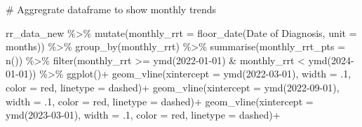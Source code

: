 \documentclass[
  letterpaper,
  DIV=11,
  numbers=noendperiod]{scrartcl}
\newenvironment{Shaded}{\begin{snugshade}}{\end{snugshade}}
\newcommand{\AttributeTok}[1]{\textcolor[rgb]{0.40,0.45,0.13}{#1}}
\newcommand{\CommentTok}[1]{\textcolor[rgb]{0.37,0.37,0.37}{#1}}
\newcommand{\DecValTok}[1]{\textcolor[rgb]{0.68,0.00,0.00}{#1}}
\newcommand{\FunctionTok}[1]{\textcolor[rgb]{0.28,0.35,0.67}{#1}}
\newcommand{\NormalTok}[1]{\textcolor[rgb]{0.00,0.23,0.31}{#1}}
\newcommand{\SpecialCharTok}[1]{\textcolor[rgb]{0.37,0.37,0.37}{#1}}
\newcommand{\StringTok}[1]{\textcolor[rgb]{0.13,0.47,0.30}{#1}}
\begin{document}
\begin{Shaded}
\begin{Highlighting}[]
\CommentTok{\# Aggregrate dataframe to show monthly trends}

\NormalTok{rr\_data\_new }\SpecialCharTok{\%\textgreater{}\%} 
  \FunctionTok{mutate}\NormalTok{(}\AttributeTok{monthly\_rrt =} \FunctionTok{floor\_date}\NormalTok{(}\StringTok{\textasciigrave{}}\AttributeTok{Date of Diagnosis}\StringTok{\textasciigrave{}}\NormalTok{, }\AttributeTok{unit =} \StringTok{\textquotesingle{}months\textquotesingle{}}\NormalTok{)) }\SpecialCharTok{\%\textgreater{}\%}
  \FunctionTok{group\_by}\NormalTok{(monthly\_rrt) }\SpecialCharTok{\%\textgreater{}\%} 
  \FunctionTok{summarise}\NormalTok{(}\AttributeTok{monthly\_rrt\_pts =} \FunctionTok{n}\NormalTok{()) }\SpecialCharTok{\%\textgreater{}\%} 
  \FunctionTok{filter}\NormalTok{(monthly\_rrt }\SpecialCharTok{\textgreater{}=} \FunctionTok{ymd}\NormalTok{(}\StringTok{\textquotesingle{}2022{-}01{-}01\textquotesingle{}}\NormalTok{) }\SpecialCharTok{\&}\NormalTok{ monthly\_rrt }\SpecialCharTok{\textless{}} \FunctionTok{ymd}\NormalTok{(}\StringTok{\textquotesingle{}2024{-}01{-}01\textquotesingle{}}\NormalTok{)) }\SpecialCharTok{\%\textgreater{}\%} 
  \FunctionTok{ggplot}\NormalTok{()}\SpecialCharTok{+}
  \FunctionTok{geom\_vline}\NormalTok{(}\AttributeTok{xintercept =} \FunctionTok{ymd}\NormalTok{(}\StringTok{\textquotesingle{}2022{-}03{-}01\textquotesingle{}}\NormalTok{), }\AttributeTok{width =}\NormalTok{ .}\DecValTok{1}\NormalTok{, }\AttributeTok{color =} \StringTok{\textquotesingle{}red\textquotesingle{}}\NormalTok{,}
             \AttributeTok{linetype =} \StringTok{\textquotesingle{}dashed\textquotesingle{}}\NormalTok{)}\SpecialCharTok{+}
  \FunctionTok{geom\_vline}\NormalTok{(}\AttributeTok{xintercept =} \FunctionTok{ymd}\NormalTok{(}\StringTok{\textquotesingle{}2022{-}09{-}01\textquotesingle{}}\NormalTok{), }\AttributeTok{width =}\NormalTok{ .}\DecValTok{1}\NormalTok{, }\AttributeTok{color =} \StringTok{\textquotesingle{}red\textquotesingle{}}\NormalTok{,}
             \AttributeTok{linetype =} \StringTok{\textquotesingle{}dashed\textquotesingle{}}\NormalTok{)}\SpecialCharTok{+}
  \FunctionTok{geom\_vline}\NormalTok{(}\AttributeTok{xintercept =} \FunctionTok{ymd}\NormalTok{(}\StringTok{\textquotesingle{}2023{-}03{-}01\textquotesingle{}}\NormalTok{), }\AttributeTok{width =}\NormalTok{ .}\DecValTok{1}\NormalTok{, }\AttributeTok{color =} \StringTok{\textquotesingle{}red\textquotesingle{}}\NormalTok{,}
             \AttributeTok{linetype =} \StringTok{\textquotesingle{}dashed\textquotesingle{}}\NormalTok{)}\SpecialCharTok{+}

\end{Highlighting}
\end{Shaded}
\end{document}

